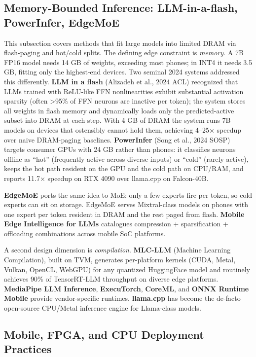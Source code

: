 \documentclass{article}
\begin{document}
\subsection{Memory-Bounded Inference: LLM-in-a-flash, PowerInfer, EdgeMoE}\label{memory-bounded-inference-llm-in-a-flash-powerinfer-edgemoe}

This subsection covers methods that fit large models into limited DRAM via flash-paging and hot/cold splits. The defining edge constraint is \emph{memory}. A 7B FP16 model needs 14 GB of weights, exceeding most phones; in INT4 it needs 3.5 GB, fitting only the highest-end devices. Two seminal 2024 systems addressed this differently. \textbf{LLM in a flash} (Alizadeh et al., 2024 ACL) recognized that LLMs trained with ReLU-like FFN nonlinearities exhibit substantial activation sparsity (often \textgreater95\% of FFN neurons are inactive per token); the system stores all weights in flash memory and dynamically loads only the predicted-active subset into DRAM at each step. With 4 GB of DRAM the system runs 7B models on devices that ostensibly cannot hold them, achieving 4--25× speedup over naive DRAM-paging baselines. \textbf{PowerInfer} (Song et al., 2024 SOSP) targets consumer GPUs with 24 GB rather than phones: it classifies neurons offline as ``hot'' (frequently active across diverse inputs) or ``cold'' (rarely active), keeps the hot path resident on the GPU and the cold path on CPU/RAM, and reports 11.7× speedup on RTX 4090 over llama.cpp on Falcon-40B.

\textbf{EdgeMoE} \citep{yi20232023} ports the same idea to MoE: only a few experts fire per token, so cold experts can sit on storage. EdgeMoE serves Mixtral-class models on phones with one expert per token resident in DRAM and the rest paged from flash. \textbf{Mobile Edge Intelligence for LLMs} \citep{qu20252025} catalogues compression + sparsification + offloading combinations across mobile SoC platforms.

A second design dimension is \emph{compilation}. \textbf{MLC-LLM} (Machine Learning Compilation), built on TVM, generates per-platform kernels (CUDA, Metal, Vulkan, OpenCL, WebGPU) for any quantized HuggingFace model and routinely achieves 90\% of TensorRT-LLM throughput on diverse edge platforms. \textbf{MediaPipe LLM Inference}, \textbf{ExecuTorch}, \textbf{CoreML}, and \textbf{ONNX Runtime Mobile} provide vendor-specific runtimes. \textbf{llama.cpp} has become the de-facto open-source CPU/Metal inference engine for Llama-class models.

\subsection{Mobile, FPGA, and CPU Deployment Practices}\label{mobile-fpga-and-cpu-deployment-practices}
\end{document}
